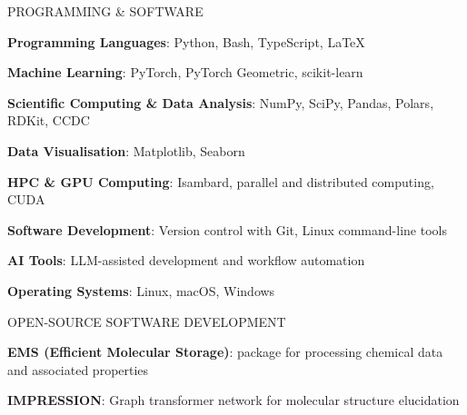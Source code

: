 
\vspace{3mm}
\begin{cventries}

  \cventry
    {PROGRAMMING \& SOFTWARE}
    {}
    {}
    {}
    {
      \begin{cvitems}
        \item {\textbf{Programming Languages}: Python, Bash, TypeScript, LaTeX}
        \item {\textbf{Machine Learning}: PyTorch, PyTorch Geometric, scikit-learn}
        \item {\textbf{Scientific Computing \& Data Analysis}: NumPy, SciPy, Pandas, Polars, RDKit, CCDC}
        \item {\textbf{Data Visualisation}: Matplotlib, Seaborn}
        \item {\textbf{HPC \& GPU Computing}: Isambard, parallel and distributed computing, CUDA}
        \item {\textbf{Software Development}: Version control with Git, Linux command-line tools}
        \item {\textbf{AI Tools}: LLM-assisted development and workflow automation}
        \item {\textbf{Operating Systems}: Linux, macOS, Windows}
      \end{cvitems}
    }

  \cventry
    {OPEN-SOURCE SOFTWARE DEVELOPMENT}
    {}
    {}
    {}
    {
      \begin{cvitems}
        \item {{\color{gray}\textbf{EMS (Efficient Molecular Storage)}}: package for processing chemical data and associated properties}
        \item {{\color{gray}\textbf{IMPRESSION}}: Graph transformer network for molecular structure elucidation}
      \end{cvitems}
    }

\end{cventries}
